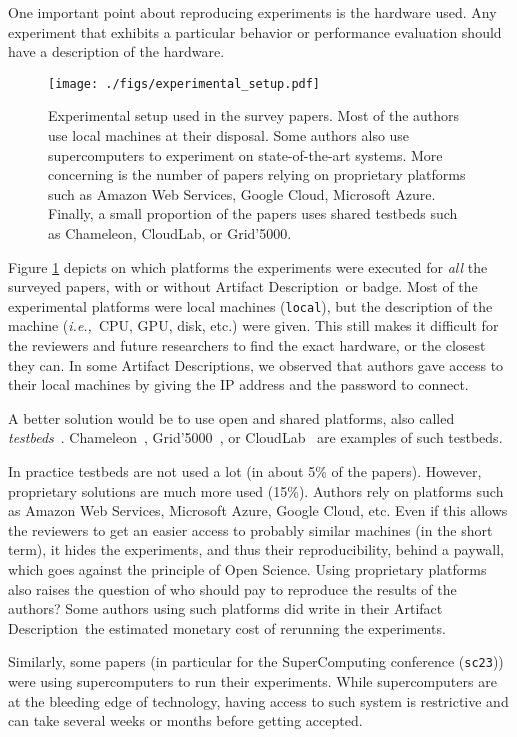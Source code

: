 \documentclass[sigconf,natbib=false]{acmart}
\newcommand{\ie}{\emph{i.e.,}}
\newcommand{\ad}{Artifact Description}
\begin{document}
One important point about reproducing experiments is the hardware used.
Any experiment that exhibits a particular behavior or performance evaluation should have a description of the hardware. 

\begin{figure}
  \centering
  \texttt{[image: ./figs/experimental\_setup.pdf]}
  \caption{Experimental setup used in the survey papers. Most of the authors use local machines at their disposal. Some authors also use supercomputers to experiment on state-of-the-art systems. More concerning is the number of papers relying on proprietary platforms such as Amazon Web Services, Google Cloud, Microsoft Azure. Finally, a small proportion of the papers uses shared testbeds such as Chameleon, CloudLab, or Grid'5000.}\label{fig:experimental_setup}
\end{figure}

Figure \ref{fig:experimental_setup} depicts on which platforms the experiments were executed for \emph{all} the surveyed papers, with or without \ad\ or badge.
Most of the experimental platforms were local machines (\texttt{local}), but the description of the machine (\ie\ CPU, GPU, disk, etc.) were given.
This still makes it difficult for the reviewers and future researchers to find the exact hardware, or the closest they can.
In some \ad s, we observed that authors gave access to their local machines by giving the IP address and the password to connect.

A better solution would be to use open and shared platforms, also called \emph{testbeds}\ \cite{nussbaum2017testbeds}.
Chameleon\ \cite{chameleon}, Grid'5000\ \cite{grid5000}, or CloudLab\ \cite{cloudlab} are examples of such testbeds.

In practice testbeds are not used a lot (in about 5\% of the papers).
However, proprietary solutions are much more used (15\%).
Authors rely on platforms such as Amazon Web Services, Microsoft Azure, Google Cloud, etc.
Even if this allows the reviewers to get an easier access to probably similar machines (in the short term), it hides the experiments, and thus their reproducibility, behind a paywall, which goes against the principle of Open Science.
Using proprietary platforms also raises the question of who should pay to reproduce the results of the authors?
Some authors using such platforms did write in their \ad\ the estimated monetary cost of rerunning the experiments.

Similarly, some papers (in particular for the SuperComputing conference (\texttt{sc23})) were using supercomputers to run their experiments.
While supercomputers are at the bleeding edge of technology, having access to such system is restrictive and can take several weeks or months before getting accepted.
\end{document}

